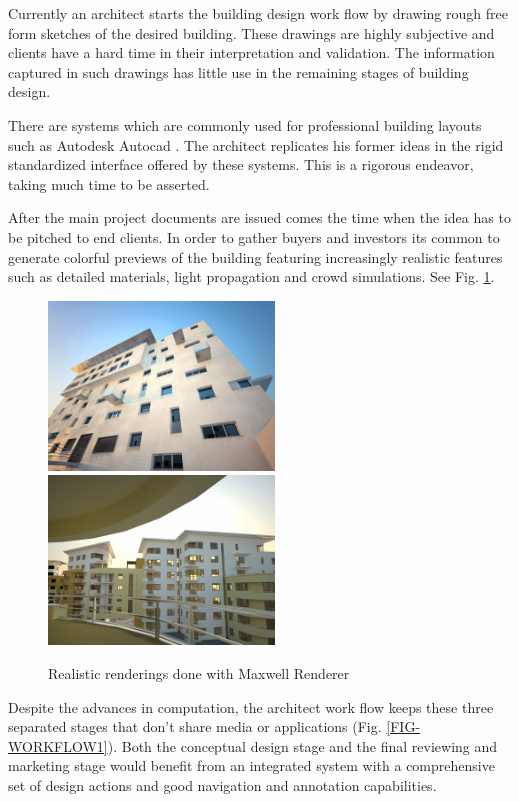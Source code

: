 Currently an architect starts the building design work flow by drawing rough
free form sketches of the desired building. These drawings are highly subjective
and clients have a hard time in their interpretation and validation.
The information captured in such drawings has little use in the remaining stages
of building design.


There are systems which are commonly used for professional building layouts
such as Autodesk Autocad \cite{SITE-AUTOCAD}.
The architect replicates his former ideas in the rigid standardized interface
offered by these systems. This is a rigorous endeavor, taking much time to be asserted.

After the main project documents are issued comes the time when the idea has to
be pitched to end clients.
In order to gather buyers and investors its common to generate colorful previews of the building featuring increasingly realistic features such as detailed materials, light propagation and crowd simulations. See
Fig. \ref{FIG-REALISTIC}.

\begin{figure}[!ht]
	\centering
	\includegraphics[width=6cm]{gfx/realistic01.jpg}
	\includegraphics[width=6cm]{gfx/realistic03.jpg}
	\caption{Realistic renderings done with Maxwell Renderer}
	\label{FIG-REALISTIC}
\end{figure}

Despite the advances in computation, the architect work flow keeps these three separated stages
that don't share media or applications (Fig. \ref{FIG-WORKFLOW1}).
Both the conceptual design stage and the final reviewing and marketing stage would benefit from 
an integrated system with a comprehensive set of design actions and good navigation and annotation
capabilities.

